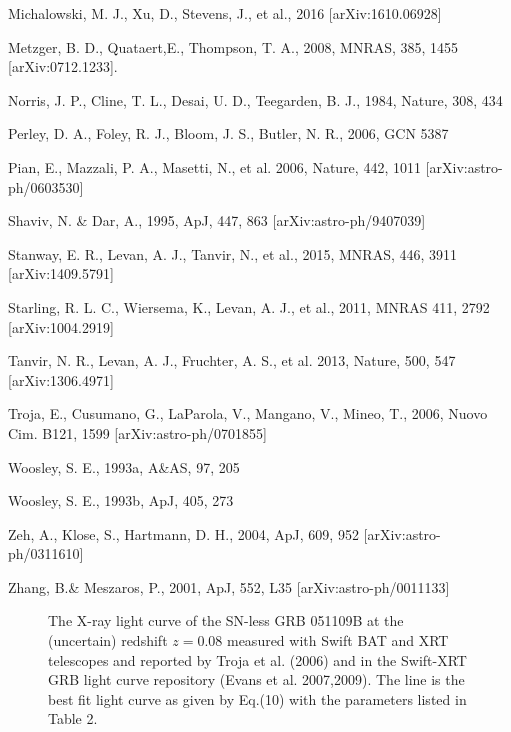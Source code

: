 \documentclass[twocolumn]{aastex61}
\begin{document}
\begin{references}
Michalowski, M. J., Xu, D., Stevens, J., et al., 2016 [arXiv:1610.06928]

Metzger, B. D., Quataert,E., Thompson, T. A., 2008, MNRAS, 385, 1455 [arXiv:0712.1233].

Norris, J. P., Cline, T. L., Desai, U. D., Teegarden, B. J., 1984, Nature, 308, 434

Perley, D. A., Foley, R. J., Bloom, J. S., Butler, N. R., 2006, GCN 5387

Pian, E., Mazzali, P. A., Masetti, N., et al. 2006, Nature, 442, 1011 [arXiv:astro-ph/0603530]

Shaviv, N. \& Dar, A., 1995, ApJ, 447, 863 [arXiv:astro-ph/9407039]

Stanway, E. R., Levan, A. J., Tanvir, N., et al., 2015, MNRAS, 446, 3911 [arXiv:1409.5791]

Starling, R. L. C., Wiersema, K., Levan, A. J., et al., 2011, MNRAS 411, 2792
[arXiv:1004.2919]

Tanvir, N. R., Levan, A. J., Fruchter, A. S.,  et al. 2013, Nature,
500, 547 [arXiv:1306.4971]

Troja, E., Cusumano, G.,   LaParola, V., Mangano, V.,  Mineo, T., 
2006,  Nuovo Cim. B121, 1599 [arXiv:astro-ph/0701855] 

Woosley, S. E., 1993a, A\&AS, 97, 205

Woosley, S. E., 1993b, ApJ, 405, 273

Zeh, A., Klose, S., Hartmann, D. H., 2004, ApJ, 609, 952 [arXiv:astro-ph/0311610]  

Zhang, B.\&  Meszaros, P., 2001, ApJ, 552, L35 [arXiv:astro-ph/0011133]

\end{references}


\begin{figure}[]
\centering
\caption{The X-ray light curve of the SN-less GRB 051109B at the 
(uncertain) redshift $z=0.08$
measured with Swift BAT and XRT telescopes  and
reported by Troja et al. (2006) 
and in the Swift-XRT GRB light curve 
repository (Evans et al. 2007,2009).
The line is the best fit light curve as given by Eq.(10)
with the parameters listed in Table 2.}     
\label{Fig1}                                                                       
\end{figure}
\end{document}
